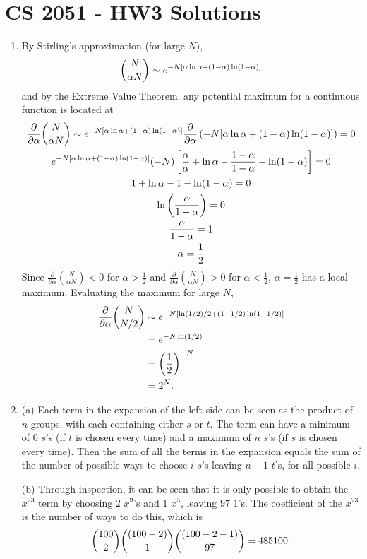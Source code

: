 \documentclass[a4paper,12pt]{article}
\begin{document}
	
	\section*{CS 2051 - HW3 Solutions}
	
	\begin{enumerate}
		
		\item By Stirling's approximation (for large $N$),
		\[ \dbinom{N}{\alpha N} \sim e^{-N[\alpha\ln\alpha + (1 - \alpha)\ln(1 - \alpha)]} \]
		and by the Extreme Value Theorem, any potential maximum for a continuous function is located at
		\begin{gather*}
		\frac{\partial}{\partial\alpha}\dbinom{N}{\alpha N} \sim e^{-N[\alpha\ln\alpha + (1 - \alpha)\ln(1 - \alpha)]} \frac{\partial}{\partial\alpha}\left(-N[\alpha\ln\alpha + (1 - \alpha)\ln(1 - \alpha)]\right) = 0 \\
		e^{-N[\alpha\ln\alpha + (1 - \alpha)\ln(1 - \alpha)]}(-N)\left[\frac{\alpha}{\alpha} + \ln\alpha - \frac{1 - \alpha}{1 - \alpha} - \ln(1 - \alpha)\right] = 0 \\
		1 + \ln\alpha - 1 - \ln(1 - \alpha) = 0 \\
		\ln\left(\frac{\alpha}{1 - \alpha}\right) = 0 \\
		\frac{\alpha}{1 - \alpha} = 1 \\
		\alpha = \frac{1}{2}
		\end{gather*}
		Since $\frac{\partial}{\partial\alpha}\binom{N}{\alpha N} < 0$ for $\alpha > \frac{1}{2}$ and $\frac{\partial}{\partial\alpha}\binom{N}{\alpha N} > 0$ for $\alpha < \frac{1}{2}$, $\alpha = \frac{1}{2}$ has a local maximum. Evaluating the maximum for large $N$,
		\begin{align*}
		\frac{\partial}{\partial\alpha}\dbinom{N}{N / 2} &\sim e^{-N[\ln(1/2) / 2 + (1 - 1/2)\ln(1 - 1/2)]} \\
		&= e^{-N\ln(1/2)} \\
		&= \left(\frac{1}{2}\right)^{-N} \\
		&= 2^N.
		\end{align*}
		
		\item (a) Each term in the expansion of the left side can be seen as the product of $n$ groups, with each containing either $s$ or $t$. The term can have a minimum of $0$ $s$'s (if $t$ is chosen every time) and a maximum of $n$ $s$'s (if $s$ is chosen every time). Then the sum of all the terms in the expansion equals the sum of the number of possible ways to choose $i$ $s$'s leaving $n - 1$ $t$'s, for all possible $i$. \par
		(b) Through inspection, it can be seen that it is only possible to obtain the $x^{23}$ term by choosing $2$ $x^9$'s and $1$ $x^5$, leaving $97$ $1$'s. The coefficient of the $x^{23}$ is the number of ways to do this, which is
		\[ \dbinom{100}{2}\dbinom{(100 - 2)}{1}\dbinom{(100 - 2 - 1)}{97} = 485100. \]
		

\end{enumerate}
\end{document}
